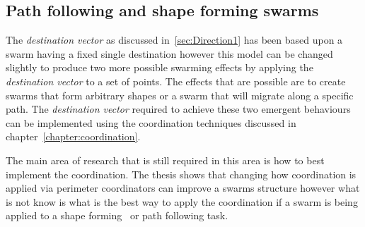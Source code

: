 \subsection{Path following and shape forming swarms}\label{sec:DirectionalShape1}
The \textit{destination vector} as discussed in~\autoref{sec:Direction1} has been based upon a swarm having a fixed single destination however this model can be changed slightly to produce two more possible swarming effects by applying the \textit{destination vector} to a set of points. The effects that are possible are to create swarms that form arbitrary shapes or a swarm that will migrate along a specific path. The \textit{destination vector} required to achieve these two emergent behaviours can be implemented using the coordination techniques discussed in chapter~\ref{chapter:coordination}.

The main area of research that is still required in this area is how to best implement the coordination. The thesis shows that changing how coordination is applied via perimeter coordinators can improve a swarms structure however what is not know is what is the best way to apply the coordination if a swarm is being applied to a shape forming~\cite{EP:07} or path following task.

